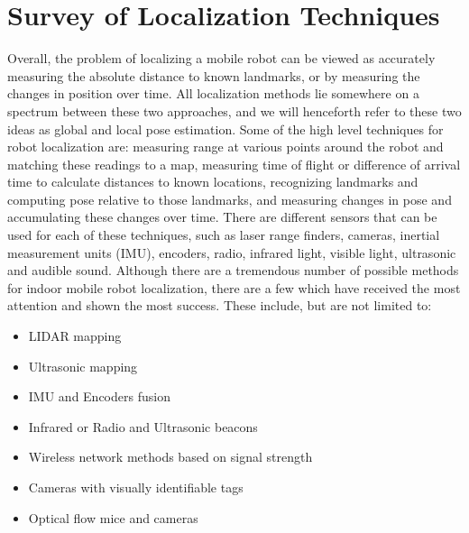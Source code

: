 \documentclass{article}
\newcommand{\Newnameref}[1]{\textit{\nameref{#1}}}
\begin{document}

\tableofcontents




\section{Survey of Localization Techniques} \label{section:related_work}

   Overall, the problem of localizing a mobile robot can be viewed as accurately measuring the absolute distance to known landmarks, or by measuring the changes in position over time. All localization methods lie somewhere on a spectrum between these two approaches, and we will henceforth refer to these two ideas as global and local pose estimation. Some of the high level techniques for robot localization are: measuring range at various points around the robot and matching these readings to a map, measuring time of flight or difference of arrival time to calculate distances to known locations, recognizing landmarks and computing pose relative to those landmarks, and measuring changes in pose and accumulating these changes over time. There are different sensors that can be used for each of these techniques, such as laser range finders, cameras, inertial measurement units (IMU), encoders, radio, infrared light, visible light, ultrasonic and audible sound. Although there are a tremendous number of possible methods for indoor mobile robot localization, there are a few which have received the most attention and shown the most success. These include, but are not limited to:
  \begin{itemize}
    \item LIDAR mapping
    \item Ultrasonic mapping
    \item IMU and Encoders fusion
    \item Infrared or Radio and Ultrasonic beacons
    \item Wireless network methods based on signal strength
    \item Cameras with visually identifiable tags
    \item Optical flow mice and cameras
  \end{itemize}
\end{document}
